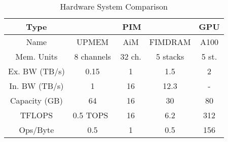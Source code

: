 
\begin{table}[t]
\footnotesize
    \centering
    \caption{Hardware System Comparison}
    \label{tab:hardware_comparison}    
    \begin{tabular}{|c|c|c|c|c|}
        \hline
        Type & \multicolumn{3}{|c|}{PIM} & GPU   \\
        \hline
        Name & UPMEM & AiM & FIMDRAM & A100 \\
        
        \hline
        Mem. Units & 8 channels & 32 ch. & 5 stacks & 5 st. \\
        \hline
        Ex. BW (TB/s) & 0.15 & 1 & 1.5 & 2 \\
        \hline
        In. BW (TB/s) & 1 & 16 & 12.3 & - \\
        \hline
        Capacity (GB) & 64 & 16 & 30 & 80 \\
        \hline
        TFLOPS & 0.5 TOPS~\footnotemark & 16 & 6.2 & 312 \\
        \hline
        Ops/Byte & 0.5 & 1 & 0.5 & 156 \\
        \hline
    \end{tabular}
\end{table}

